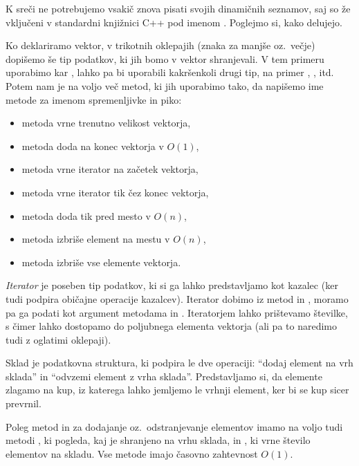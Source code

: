 
K sreči ne potrebujemo vsakič znova pisati svojih dinamičnih seznamov, saj so že
vključeni v standardni knjižnici C++ pod imenom .
Poglejmo si, kako delujejo.


Ko deklariramo vektor, v trikotnih oklepajih (znaka za manjše oz.~večje)
dopišemo še tip podatkov, ki jih bomo v vektor shranjevali.
V tem primeru uporabimo kar , lahko pa bi uporabili kakršenkoli drugi
tip, na primer , ,  itd.
Potem nam je na voljo več metod, ki jih uporabimo tako, da napišemo ime metode
za imenom spremenljivke in piko:
\begin{itemize}
\item metoda  vrne trenutno velikost vektorja,
\item metoda  doda  na konec vektorja v $O(1)$,
\item metoda  vrne iterator na začetek vektorja,
\item metoda  vrne iterator tik čez konec vektorja,
\item metoda  doda  tik pred mesto  v
  $O(n)$,
\item metoda  izbriše element na mestu  v $O(n)$,
\item metoda  izbriše vse elemente vektorja.
\end{itemize}
\emph{Iterator} je poseben tip podatkov, ki si ga lahko predstavljamo kot
kazalec (ker tudi podpira običajne operacije kazalcev).
Iterator dobimo iz metod  in , moramo pa ga podati kot
argument metodama  in .
Iteratorjem lahko prištevamo številke, s čimer lahko dostopamo do poljubnega
elementa vektorja (ali pa to naredimo tudi z oglatimi oklepaji).


Sklad je podatkovna struktura, ki podpira le dve operaciji:
\enquote{dodaj element na vrh sklada} in \enquote{odvzemi element z vrha
  sklada}.
Predstavljamo si, da elemente zlagamo na kup, iz katerega lahko jemljemo le
vrhnji element, ker bi se kup sicer prevrnil.


Poleg metod  in  za dodajanje oz.~odstranjevanje
elementov imamo na voljo tudi metodi , ki pogleda, kaj je shranjeno
na vrhu sklada, in , ki vrne število elementov na skladu.
Vse metode imajo časovno zahtevnost $O(1)$.

